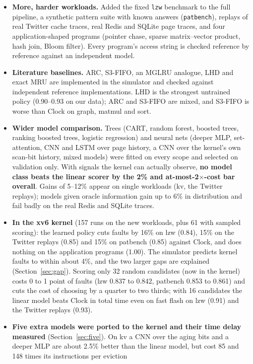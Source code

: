 \documentclass[10.5pt,a4paper]{article}
\newcommand{\code}[1]{\texttt{#1}}
\newcommand{\best}[1]{\textbf{\textcolor{good}{#1}}}
\begin{document}
\begin{itemize}
\item \textbf{More, harder workloads.} Added the fixed \code{lzw} benchmark to the full pipeline, a synthetic
  pattern suite with known answers (\code{patbench}), replays of real Twitter cache traces, real Redis and
  SQLite page traces, and four application-shaped programs (pointer chase, sparse matrix--vector product, hash
  join, Bloom filter). Every program's access string is checked reference by reference against an independent
  model.
\item \textbf{Literature baselines.} ARC, S3-FIFO, an MGLRU analogue, LHD and exact MRU are implemented in the
  simulator and checked against independent reference implementations. LHD is the strongest untrained policy
  (0.90--0.93 on our data); ARC and S3-FIFO are mixed, and S3-FIFO is worse than Clock on graph, matmul and sort.
\item \textbf{Wider model comparison.} Trees (CART, random forest, boosted trees, ranking boosted trees, logistic regression)
  and neural nets (deeper MLP, set-attention, CNN and LSTM over page history, a CNN over the kernel's own
  scan-bit history, mixed models) were fitted on every scope and selected on validation only. With signals the
  kernel can actually observe, \best{no model class beats the linear scorer by the 2\% and at-most-2$\times$-cost
  bar overall}. Gains of 5--12\% appear on single workloads (kv, the Twitter replays);
  models given oracle information gain up to 6\% in distribution and fail badly on the real Redis and SQLite traces.
\item \textbf{In the xv6 kernel} (157 runs on the new workloads, plus 61 with sampled scoring): the learned
  policy cuts faults by 16\% on lzw (0.84), 15\% on the Twitter replays (0.85) and 15\% on patbench (0.85)
  against Clock, and does nothing on the application programs (1.00). The simulator predicts kernel faults to
  within about 4\%, and the two larger gaps are explained (Section~\ref{sec:gap}). Scoring only 32 random candidates (now in the kernel) costs 0 to 1 point of faults (lzw 0.837 to 0.842, patbench 0.853 to 0.861) and cuts the cost of choosing by a quarter to two thirds; with 16 candidates the linear model beats Clock in total time even on fast flash on lzw (0.91) and the Twitter replays (0.93).
\item \textbf{Five extra models were ported to the kernel and their time delay measured} (Section~\ref{sec:five}). On kv a CNN over the
  aging bits and a deeper MLP are about 2.5\% better than the linear model, but cost 85 and 148 times its instructions per eviction

\end{itemize}
\end{document}
